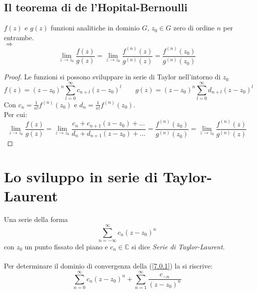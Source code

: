 \documentclass[twoside]{article}
\begin{document}
\subsection{Il teorema di de l'Hopital-Bernoulli}
$f(z)$ e $g(z)$ funzioni analitiche in dominio $G$, $z_0\in G$ zero di ordine $n$ per entrambe.\\
$\Longrightarrow$
\begin{equation}
    \lim_{z\to z_0}\frac{f(z)}{g(z)}=\lim_{z\to z_0}\frac{f^{(n)}(z)}{g^{(n)}(z)}=\frac{f^{(n)}(z_0)}{g^{(n)}(z_0)}
\end{equation}
\begin{proof}
Le funzioni si possono sviluppare in serie di Taylor nell'intorno di $z_0$
\begin{equation}
    f(z)=(z-z_0)^n\sum_{l=0}^\infty c_{n+l}(z-z_0)^l \qquad g(z)=(z-z_0)^n\sum_{l=0}^\infty d_{n+l}(z-z_0)^l
\end{equation}
Con $c_n=\frac{1}{n!}f^{(n)}(z_0)$ e $d_n=\frac{1}{n!}f^{(n)}(z_0)$.\\
Per cui:
\begin{equation}
    \lim_{z\to z_0}\frac{f(z)}{g(z)}=\lim_{z\to z_0}\frac{c_n+c_{n+1}(z-z_0)+...}{d_n+d_{n+1}(z-z_0)+...}=\frac{f^{(n)}(z_0)}{g^{(n)}(z_0)}=\lim_{z\to z_0}\frac{f^{(n)}(z)}{g^{(n)}(z)}
\end{equation}
\end{proof}

\newpage
\section{Lo sviluppo in serie di Taylor-Laurent}
\begin{comment}
\begin{wrapfigure}[7]{L}{0.1\textwidth}
  \begin{center}
    \texttt{[image: taylor.jpg]}
  \end{center}
\end{wrapfigure}\leavevmode

\vspace{1.5 cm}
\epigraph{Non è improbabile che la sua vita sia stata accorciata dalle sue abitudini sedentarie.}{\textit{John Mason Good, parlando di Brook Taylor}}
\vspace{1.5 cm}
\end{comment}

Una serie della forma
\begin{equation} \label{7.0.1}
    \sum_{n=-\infty}^{\infty}c_n(z-z_0)^n
\end{equation}
con $z_0$ un punto fissato del piano e $c_n \in \mathds{C}$ si dice \textit{Serie di Taylor-Laurent}.
\\ \\
Per determinare il dominio di convergenza della (\ref{7.0.1}) la si riscrive:
\begin{equation}
    \sum_{n=0}^{\infty} c_n(z-z_0)^n + \sum_{n=1}^{\infty} \frac{c_{-n}}{(z-z_0)^n}
\end{equation}
\end{document}
